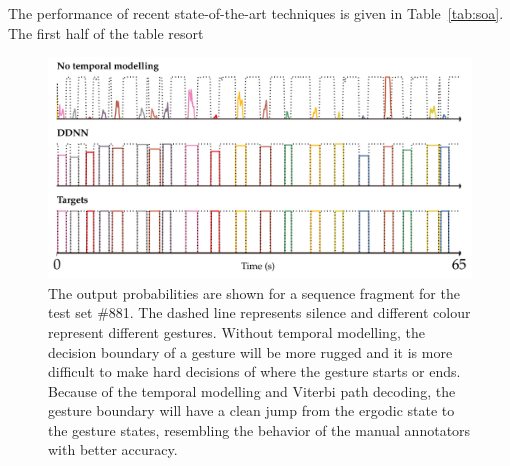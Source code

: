 




The performance of recent state-of-the-art techniques is given in Table~\ref{tab:soa}. The first half of the table resort

%


\begin{figure}[t]
  \centering
  \includegraphics[width=.7\textwidth]{images/output.pdf}
  \caption{The output probabilities are shown for a sequence fragment for the test set \#881. The dashed line represents silence and different colour represent different gestures. Without temporal modelling, the decision boundary of a gesture will be more rugged and it is more difficult to make hard decisions of where the gesture starts or ends. Because of the temporal modelling and Viterbi path decoding, the gesture boundary will have a clean jump from the ergodic state to the gesture states, resembling the behavior of the manual annotators with better accuracy.}
    \label{fig:temporalModellingComparision}
\end{figure}

